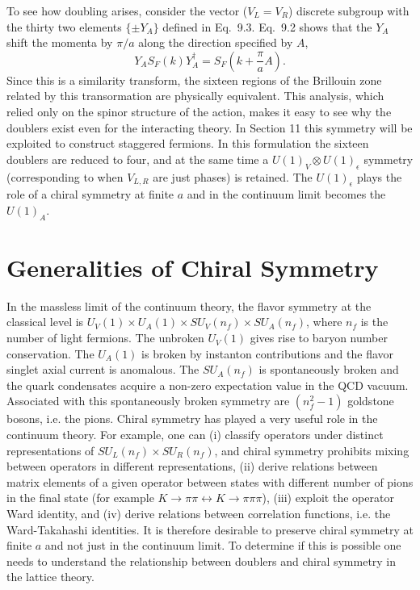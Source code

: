 To see how doubling arises, consider the vector ($V_L = V_R$) discrete
subgroup with the thirty two elements $\{\pm Y_A\}$ defined in Eq.~9.3. Eq.~9.2
shows that the $Y_A$ shift the momenta by $\pi/a$ along the direction specified
by $A$,
\begin{equation}
Y_A S_F(k) Y_A^\dagger = S_F\!\left( k + \frac{\pi}{a} A \right) .
\end{equation}
Since this is a similarity transform, the sixteen regions of the Brillouin
zone related by this transormation are physically equivalent. This analysis,
which relied only on the spinor structure of the action, makes it easy to
see why the doublers exist even for the interacting theory. In Section 11
this symmetry will be exploited to construct staggered fermions. In this
formulation the sixteen doublers are reduced to four, and at the same time
a $U(1)_V \otimes U(1)_\epsilon$ symmetry (corresponding to when $V_{L,R}$ are just phases)
is retained. The $U(1)_\epsilon$ plays the role of a chiral symmetry at finite $a$ and
in the continuum limit becomes the $U(1)_A$.

\section{Generalities of Chiral Symmetry}

In the massless limit of the continuum theory, the flavor symmetry at the
classical level is $U_V(1) \times U_A(1) \times SU_V(n_f) \times SU_A(n_f)$, where $n_f$ is the
number of light fermions. The unbroken $U_V(1)$ gives rise to baryon number
conservation. The $U_A(1)$ is broken by instanton contributions and the flavor
singlet axial current is anomalous. The $SU_A(n_f)$ is spontaneously broken
and the quark condensates acquire a non-zero expectation value in the
QCD vacuum. Associated with this spontaneously broken symmetry are
$(n_f^2 - 1)$ goldstone bosons, i.e. the pions. Chiral symmetry has played a
very useful role in the continuum theory. For example, one can (i) classify
operators under distinct representations of $SU_L(n_f) \times SU_R(n_f)$, and chiral
symmetry prohibits mixing between operators in different representations,
(ii) derive relations between matrix elements of a given operator between
states with different number of pions in the final state (for example
$K \to \pi\pi \leftrightarrow K \to \pi\pi\pi$), (iii) exploit the operator Ward identity, and (iv)
derive relations between correlation functions, i.e. the Ward-Takahashi
identities. It is therefore desirable to preserve chiral symmetry at finite
$a$ and not just in the continuum limit. To determine if this is possible one
needs to understand the relationship between doublers and chiral symmetry
in the lattice theory.

